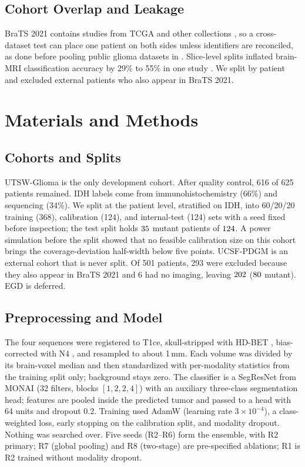 \documentclass[conference]{IEEEtran}
\begin{document}
\subsection{Cohort Overlap and Leakage}
BraTS 2021 contains studies from TCGA and other collections \cite{dorfner2025}, so a cross-dataset test can place one patient on both sides unless identifiers are reconciled, as done before pooling public glioma datasets in \cite{ren2025}. Slice-level splits inflated brain-MRI classification accuracy by 29\% to 55\% in one study \cite{yagis2021}. We split by patient and excluded external patients who also appear in BraTS 2021.

\section{Materials and Methods}

\subsection{Cohorts and Splits}
UTSW-Glioma \cite{reddy2026utsw} is the only development cohort. After quality control, 616 of 625 patients remained. IDH labels come from immunohistochemistry (66\%) and sequencing (34\%). We split at the patient level, stratified on IDH, into 60/20/20 training (368), calibration (124), and internal-test (124) sets with a seed fixed before inspection; the test split holds $35$ mutant patients of $124$. A power simulation before the split showed that no feasible calibration size on this cohort brings the coverage-deviation half-width below five points. UCSF-PDGM \cite{calabrese2022ucsf} is an external cohort that is never split. Of 501 patients, 293 were excluded because they also appear in BraTS 2021 and 6 had no imaging, leaving $202$ ($80$ mutant). EGD is deferred.

\subsection{Preprocessing and Model}
The four sequences were registered to T1ce, skull-stripped with HD-BET \cite{isensee2019hdbet}, bias-corrected with N4 \cite{tustison2010n4}, and resampled to about 1\,mm. Each volume was divided by its brain-voxel median and then standardized with per-modality statistics from the training split only; background stays zero. The classifier is a SegResNet \cite{myronenko2019segresnet} from MONAI \cite{cardoso2022monai} (32 filters, blocks $[1,2,2,4]$) with an auxiliary three-class segmentation head; features are pooled inside the predicted tumor and passed to a head with 64 units and dropout 0.2. Training used AdamW \cite{loshchilov2019adamw} (learning rate $3\times10^{-4}$), a class-weighted loss, early stopping on the calibration split, and modality dropout. Nothing was searched over. Five seeds (R2--R6) form the ensemble, with R2 primary; R7 (global pooling) and R8 (two-stage) are pre-specified ablations; R1 is R2 trained without modality dropout.
\end{document}
